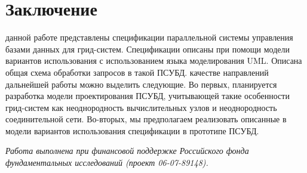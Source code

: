 \documentclass[11pt,oneside]{article}
\begin{document}
	\section{Заключение}\label{S_Conclusion}
	 данной работе представлены спецификации параллельной системы управления базами данных для грид-систем. Спецификации описаны при помощи модели вариантов использования с использованием языка моделирования UML. Описана общая схема обработки запросов в такой ПСУБД.
	 качестве направлений дальнейшей работы можно выделить следующие. Во первых, планируется разработка модели проектирования ПСУБД, учитывающей такие особенности грид-систем как неоднородность вычислительных узлов и неоднородность соединительной сети. Во-вторых, мы предполагаем реализовать описанные в модели вариантов использования спецификации в прототипе ПСУБД.
	\par{\it Работа выполнена при финансовой поддержке Российского фонда фундаментальных исследований (проект 06-07-89148).}
\end{document}
